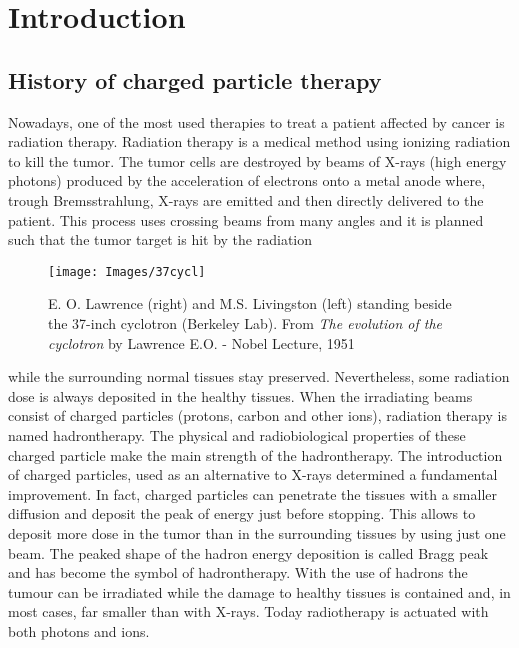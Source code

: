 \documentclass[12pt, a4paper, twoside]{book}
\begin{document}
\tableofcontents

\chapter{Introduction} %

\section{History of charged particle therapy}

Nowadays, one of the most used therapies to treat a patient affected by cancer is radiation therapy. Radiation therapy is a medical method using ionizing radiation to kill the tumor. The tumor cells are destroyed by beams of X-rays (high energy photons) produced by the acceleration of electrons onto a metal anode where, trough Bremsstrahlung, X-rays are emitted and then directly delivered to the patient. 
This process uses crossing beams from many angles and it is planned such that the tumor target is hit by the radiation
\begin{wrapfigure}{r}{.5\textwidth}
\centering
{\texttt{[image: Images/37cycl]}}
\caption{E. O. Lawrence (right) and M.S. Livingston (left) standing beside the 37-inch
cyclotron (Berkeley Lab). From \emph{The evolution of the cyclotron} by Lawrence E.O. -
Nobel Lecture, 1951}
\label{fig:37cycl}
\vspace{-5mm}
\end{wrapfigure}
\noindent while the surrounding normal tissues stay preserved. Nevertheless, some radiation dose is always deposited in the healthy tissues.
When the irradiating beams consist of charged particles (protons, carbon and other ions), radiation therapy is named hadrontherapy. The physical and radiobiological properties of these charged particle make the main strength of the hadrontherapy.
The introduction of charged particles, used as an alternative to X-rays determined a fundamental improvement. In fact, charged particles can penetrate the tissues with a smaller diffusion and deposit the peak of energy just before stopping. This allows to deposit more dose in the tumor than in the surrounding tissues by using just one beam.
The peaked shape of the hadron energy deposition is called Bragg peak and has become the symbol of hadrontherapy. With the use of hadrons the tumour can be irradiated while the damage to healthy tissues is contained and, in most cases, far smaller than with X-rays. Today radiotherapy is actuated with both photons and ions.
\end{document}
